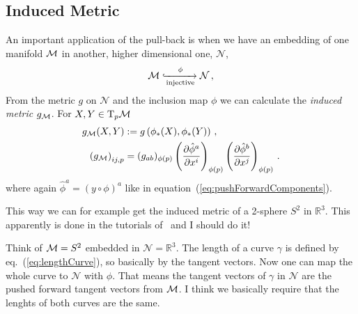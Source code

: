 \documentclass[11pt, a4paper, twocolumn]{article} %
\begin{document}
\subsection{Induced Metric}
An important application of the pull-back is when we have an embedding
of one manifold $\mathcal{M}$ in another, higher dimensional one, $\mathcal{N}$,
\begin{equation}
    \mathcal{M} \xhookrightarrow[\text{injective}]{\phi} \mathcal{N}\,,
\end{equation}
From the metric $g$ on $\mathcal{N}$ and the inclusion map $\phi$ we can calculate
the \textit{induced metric} $g_{\mathcal{M}}$.
For $X,Y\in\T_p \M$
\begin{align}
    g_{\mathcal{M}}(X,Y) &:= g\left( \phi_*(X), \phi_*(Y) \right)\,,\\
    \left( g_{\mathcal{M}} \right)_{ij,p} &= (g_{ab})_{\phi(p)}\left( \frac{\partial \hat{\phi}^a}{\partial x^i} \right)_{\phi(p)}
    \left( \frac{\partial \hat{\phi}^b}{\partial x^j} \right)_{\phi(p)}\,.
\end{align}
where again $\hat{\phi}^a = (y\circ\phi)^a$ like in equation~(\ref{eq:pushForwardComponents}).
\begin{note}
    This way we can for example get the induced metric of a 2-sphere $S^2$ in
    $\mathbb{R}^3$.
    This apparently is done in the tutorials of~\cite{Schuller15} and I should do it!
\end{note}
\begin{note}
    Think of $\mathcal{M}=S^2$ embedded in $\mathcal{N} = \mathbb{R}^3$.
    The length of a curve $\gamma$ is defined by eq.~(\ref{eq:lengthCurve}), 
    so basically by the tangent vectors.
    Now one can map the whole curve to $\mathcal{N}$ with $\phi$.
    That means the tangent vectors of $\gamma$ in $\mathcal{N}$ are the 
    pushed forward tangent vectors from $\mathcal{M}$.
    I think we basically require that the lenghts of both curves are the same.
\end{note}
\end{document}
